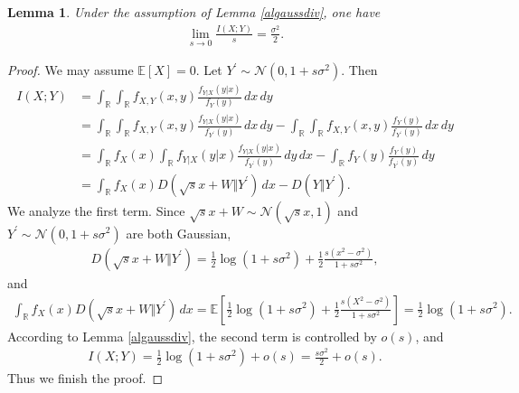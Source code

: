 \documentclass{article}
\numberwithin{equation}{section}
\newcommand{\E}{\mathbb{E}}
\newcommand{\bbR}{\mathbb{R}}
\renewcommand{\cal}{\mathcal}
\theoremstyle{plain}
\newtheorem{lemma}[theorem]{Lemma}
\theoremstyle{definition}
\begin{document}
\begin{lemma}\label{mutualinflimit}
Under the assumption of Lemma \ref{algaussdiv}, one have
\begin{align*}
	\lim_{s\to 0}\frac{I(X;Y)}{s}=\frac{\sigma^2}{2}.
\end{align*}
\end{lemma}
\begin{proof}
We may assume $\E[X]=0$. Let $Y^\prime\sim\cal{N}(0,1+s\sigma^2)$. Then
\begin{align*}
	I(X;Y)&=\int_{\bbR}\int_{\bbR}f_{X,Y}(x,y)\frac{f_{Y|X}(y|x)}{f_Y(y)}\,dx\,dy\\
	&=\int_{\bbR}\int_{\bbR}f_{X,Y}(x,y)\frac{f_{Y|X}(y|x)}{f_{Y^\prime}(y)}\,dx\,dy-\int_{\bbR}\int_{\bbR}f_{X,Y}(x,y)\frac{f_Y(y)}{f_{Y^\prime}(y)}\,dx\,dy\\
	&=\int_{\bbR}f_X(x)\int_{\bbR}f_{Y|X}(y|x)\frac{f_{Y|X}(y|x)}{f_{Y^\prime}(y)}\,dy\,dx-\int_{\bbR}f_{Y}(y)\frac{f_Y(y)}{f_{Y^\prime}(y)}\,dy\\
	&=\int_{\bbR}f_X(x)D(\sqrt{s}x+W\Vert Y^\prime)\,dx-D(Y\Vert Y^\prime).
\end{align*}
We analyze the first term. Since $\sqrt{s}x+W\sim\cal{N}(\sqrt{s}x,1)$ and $Y^\prime\sim\cal{N}(0,1+s\sigma^2)$ are both Gaussian,
\begin{align*}
	D(\sqrt{s}x+W\Vert Y^\prime)=\frac{1}{2}\log(1+s\sigma^2)+\frac{1}{2}\frac{s(x^2-\sigma^2)}{1+s\sigma^2},
\end{align*}
and
\begin{align*}
	\int_{\bbR}f_X(x)D(\sqrt{s}x+W\Vert Y^\prime)\,dx=\E\left[\frac{1}{2}\log(1+s\sigma^2)+\frac{1}{2}\frac{s(X^2-\sigma^2)}{1+s\sigma^2}\right]=\frac{1}{2}\log(1+s\sigma^2).
\end{align*}
According to Lemma \ref{algaussdiv}, the second term is controlled by $o(s)$, and
\begin{align*}
	I(X;Y)=\frac{1}{2}\log(1+s\sigma^2)+o(s)=\frac{s\sigma^2}{2}+o(s).
\end{align*}
Thus we finish the proof.
\end{proof}
\end{document}
